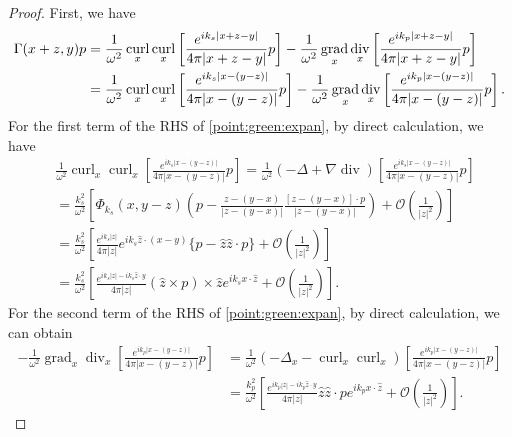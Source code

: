 \documentclass[a4paper,11pt]{article}
\theoremstyle{remark}
\theoremstyle{definition}
\numberwithin{equation}{section}
\DeclareMathOperator{\curl}{curl}
\DeclareMathOperator{\Div}{div}
\DeclareMathOperator{\grad}{grad}
\begin{document}
\begin{proof}
First, we have
\begin{align}
\Gamma(x+z,y)p  &= \frac{1}{\omega^2}\curl_{x} \curl_{x} \left[\frac{e^{ik_{s}|x+z-y|}}{4 \pi |x+z-y|}p\right] - \frac{1}{\omega^2} \grad_{x} \Div_{x} \left[\frac{e^{ik_{p}|x+z-y|}}{4 \pi |x+z-y|}p\right] \notag \\
&=\frac{1}{\omega^2}\curl_{x} \curl_{x} \left[\frac{e^{ik_{s}|x-(y-z)|}}{4 \pi |x-(y-z)|}p\right] - \frac{1}{\omega^2} \grad_{x} \Div_{x} \left[\frac{e^{ik_{p}|x-(y-z)|}}{4 \pi |x-(y-z)|}p\right]. \label{point:green:expan}
\end{align}
For the first term of the RHS of \eqref{point:green:expan}, by direct calculation, we have %
\begin{equation}\label{up:first:expan}
\begin{aligned}
&\frac{1}{\omega^2}\curl_{x} \curl_{x} \left[\frac{e^{ik_{s}|x-(y-z)|}}{4 \pi |x-(y-z)|}p\right]  =
\frac{1}{\omega^2}(-\Delta + \nabla \Div )\left[\frac{e^{ik_{s}|x-(y-z)|}}{4 \pi |x-(y-z)|}p\right] \\
&=\frac{k_s^2}{\omega^2} \left[\Phi_{k_s}(x,y-z) \left(p-\frac{z-(y-x)}{|z-(y-x)|}\frac{[z-(y-x)]\cdot p}{|z-(y-x)|}\right) + \mathcal{O}(\frac{1}{|z|^2})\right] \\
& = \frac{k_s^2}{\omega^2} \left[ \frac{e^{ik_s|z|}}{4 \pi |z|}  e^{ik_s \hat{z} \cdot (x-y)}\{p - \hat{z} \hat{z} \cdot p\} + \mathcal{O}(\frac{1}{|z|^2})\right]  \\
& = \frac{k_s^2}{\omega^2} \left[\frac{e^{ik_s|z|-ik_s\hat{z} \cdot y}}{4 \pi |z|}  (\hat{z}\times p) \times \hat{z} e^{ik_sx\cdot \hat{z}}  + \mathcal{O}(\frac{1}{|z|^2})\right].
\end{aligned}
\end{equation}
For the second term of the RHS of \eqref{point:green:expan}, by direct calculation, we can obtain
\begin{equation}\label{up:second:expan}
\begin{aligned}
- \frac{1}{\omega^2} \grad_{x} \Div_{x} \left[\frac{e^{ik_{p}|x-(y-z)|}}{4 \pi |x-(y-z)|}p\right]
& = \frac{1}{\omega^2}(-\Delta_x - \curl_{x} \curl_{x})\left[\frac{e^{ik_{p}|x-(y-z)|}}{4 \pi |x-(y-z)|}p\right]\\
&=\frac{k_{p}^2}{\omega^2} \left[\frac{e^{ik_p|z|-ik_p\hat{z} \cdot y}}{4 \pi |z|}  \hat{z} \hat{z}\cdot p e^{ik_px\cdot \hat{z}}+\mathcal{O}(\frac{1}{|z|^2})\right].

\end{aligned}
\end{equation}
\end{proof}
\end{document}

